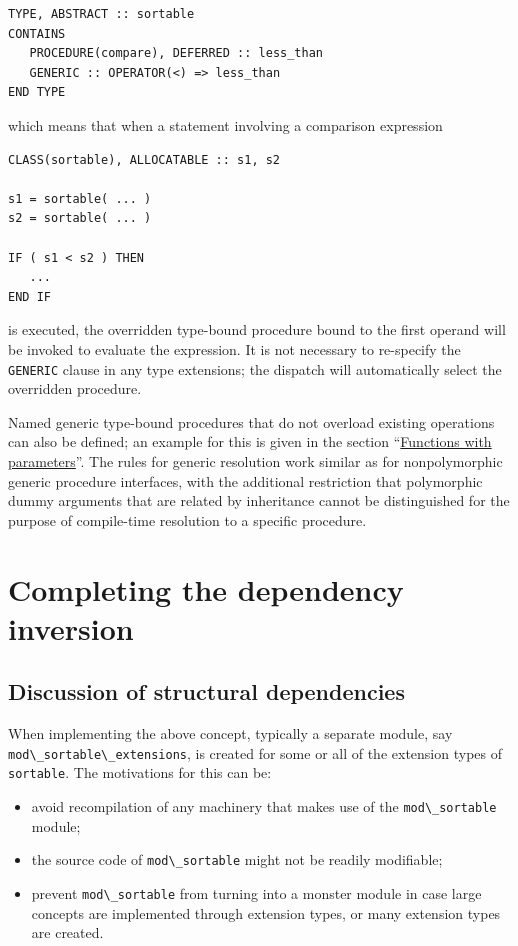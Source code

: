 \documentclass[
  paper=a4,
  ,captions=tableheading
]{scrartcl}
\newcommand{\passthrough}[1]{#1}
\providecommand{\tightlist}{%
  \setlength{\itemsep}{0pt}\setlength{\parskip}{0pt}}
\begin{document}
\begin{lstlisting}
TYPE, ABSTRACT :: sortable
CONTAINS
   PROCEDURE(compare), DEFERRED :: less_than
   GENERIC :: OPERATOR(<) => less_than
END TYPE
\end{lstlisting}

which means that when a statement involving a comparison expression

\begin{lstlisting}
CLASS(sortable), ALLOCATABLE :: s1, s2

s1 = sortable( ... )
s2 = sortable( ... )

IF ( s1 < s2 ) THEN
   ...
END IF
\end{lstlisting}

is executed, the overridden type-bound procedure bound to the first
operand will be invoked to evaluate the expression. It is not necessary
to re-specify the \passthrough{\lstinline!GENERIC!} clause in any type
extensions; the dispatch will automatically select the overridden
procedure.

Named generic type-bound procedures that do not overload existing
operations can also be defined; an example for this is given in the
section ``\hyperref[sec:functions_with_parameters]{Functions with
parameters}''. The rules for generic resolution work similar as for
nonpolymorphic generic procedure interfaces, with the additional
restriction that polymorphic dummy arguments that are related by
inheritance cannot be distinguished for the purpose of compile-time
resolution to a specific procedure.

\section{Completing the dependency
inversion}\label{completing-the-dependency-inversion}

\subsection{Discussion of structural
dependencies}\label{discussion-of-structural-dependencies}

When implementing the above concept, typically a separate module, say
\passthrough{\lstinline!mod\_sortable\_extensions!}, is created for some
or all of the extension types of \passthrough{\lstinline!sortable!}. The
motivations for this can be:

\begin{itemize}
\tightlist
\item
  avoid recompilation of any machinery that makes use of the
  \passthrough{\lstinline!mod\_sortable!} module;
\item
  the source code of \passthrough{\lstinline!mod\_sortable!} might not
  be readily modifiable;
\item
  prevent \passthrough{\lstinline!mod\_sortable!} from turning into a
  monster module in case large concepts are implemented through
  extension types, or many extension types are created.
\end{itemize}
\end{document}
